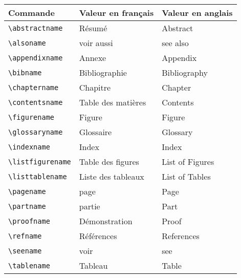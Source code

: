 \begin{tabular}{lll}
  Commande                    & Valeur en français & Valeur en anglais \\\toprule
  \lstinline+\abstractname+   & Résumé             & Abstract          \\
  \lstinline+\alsoname+       & voir aussi         & see also          \\
  \lstinline+\appendixname+   & Annexe             & Appendix          \\
  \lstinline+\bibname+        & Bibliographie      & Bibliography      \\
  \lstinline+\chaptername+    & Chapitre           & Chapter           \\
  \lstinline+\contentsname+   & Table des matières & Contents          \\
  \lstinline+\figurename+     & Figure             & Figure            \\
  \lstinline+\glossaryname+   & Glossaire          & Glossary          \\
  \lstinline+\indexname+      & Index              & Index             \\
  \lstinline+\listfigurename+ & Table des figures  & List of Figures   \\
  \lstinline+\listtablename+  & Liste des tableaux & List of Tables    \\
  \lstinline+\pagename+       & page               & Page              \\
  \lstinline+\partname+       & partie             & Part              \\
  \lstinline+\proofname+      & Démonstration      & Proof             \\
  \lstinline+\refname+        & Références         & References        \\
  \lstinline+\seename+        & voir               & see               \\
  \lstinline+\tablename+      & Tableau            & Table             \\\bottomrule
\end{tabular}
